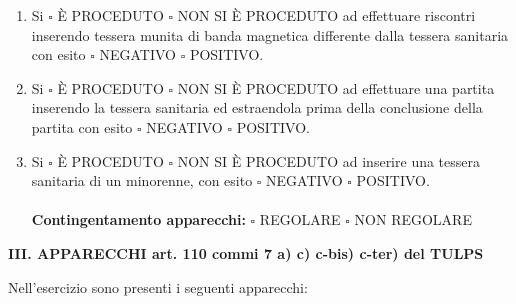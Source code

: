 \documentclass[12pt]{article}
\begin{document}
\begin{enumerate}[resume]
    \item Si \begin{math}\square\end{math} È PROCEDUTO \begin{math}\square\end{math} NON SI È PROCEDUTO ad effettuare riscontri inserendo tessera munita di banda magnetica differente dalla tessera sanitaria con esito \begin{math}\square\end{math} NEGATIVO \begin{math}\square\end{math} POSITIVO.
    \item Si \begin{math}\square\end{math} È PROCEDUTO \begin{math}\square\end{math} NON SI È PROCEDUTO  ad effettuare una partita inserendo la tessera sanitaria ed estraendola prima della conclusione della partita con esito \begin{math}\square\end{math} NEGATIVO \begin{math}\square\end{math} POSITIVO.
    \item Si \begin{math}\square\end{math} È PROCEDUTO \begin{math}\square\end{math} NON SI È PROCEDUTO  ad inserire una tessera sanitaria di un minorenne, con esito \begin{math}\square\end{math} NEGATIVO \begin{math}\square\end{math} POSITIVO.
    \\ \\
    \textbf{Contingentamento apparecchi:} \begin{math}\square\end{math} REGOLARE \begin{math}\square\end{math} NON REGOLARE
    \\
\end{enumerate}

\begin{center}
    \textbf{III.	APPARECCHI art. 110 commi 7 a) c) c-bis) c-ter) del TULPS }
\end{center}
Nell'esercizio sono presenti i seguenti apparecchi:
\end{document}
